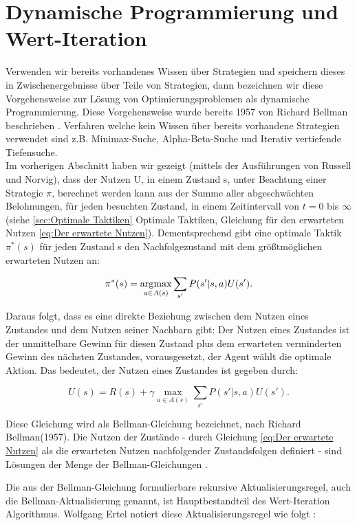 \section{Dynamische Programmierung und Wert-Iteration}
Verwenden wir bereits vorhandenes Wissen über Strategien und speichern dieses in Zwischenergebnisse über Teile von Strategien, dann bezeichnen wir diese Vorgehensweise zur Lösung von Optimierungsproblemen als dynamische Programmierung. Diese Vorgehensweise wurde bereits 1957 von Richard Bellman beschrieben \cite[293]{Ertel}. Verfahren welche kein Wissen über bereits vorhandene Strategien verwendet sind z.B. Minimax-Suche, Alpha-Beta-Suche und Iterativ vertiefende Tiefensuche.\\

Im vorherigen Abschnitt haben wir gezeigt (mittels der Ausführungen von Russell und Norvig), dass der Nutzen U, in einem Zustand s, unter Beachtung einer Strategie $\pi$, berechnet werden kann aus der Summe aller abgeschwächten Belohnungen, für jeden besuchten Zustand, in einem Zeitintervall von $t = 0$ bis $\infty$ (siehe \ref{sec:Optimale Taktiken} Optimale Taktiken, Gleichung für den erwarteten Nutzen \ref{eq:Der erwartete Nutzen}). Dementsprechend gibt eine optimale Taktik $\pi^*(s)$ für jeden Zustand s den Nachfolgezustand mit dem größtmöglichen erwarteten Nutzen an:

\begin{equation}
\pi^*(s) = \operatorname*{arg\!\max}_{a \in A(s)} \sum_{s'} P(s'|s, a) U(s').
\end{equation}

Daraus folgt, dass es eine direkte Beziehung zwischen dem Nutzen eines Zustandes und dem Nutzen seiner Nachbarn gibt: Der Nutzen eines Zustandes ist der unmittelbare Gewinn für diesen Zustand plus dem erwarteten verminderten Gewinn des nächsten Zustandes, vorausgesetzt, der Agent wählt die optimale Aktion. Das bedeutet, der Nutzen eines Zustandes ist gegeben durch:

\begin{equation}
U(s) = R(s) + \gamma \max_{a \in A(s)} \sum_{s'} P(s'|s, a) U(s').
\end{equation}

Diese Gleichung wird als Bellman-Gleichung bezeichnet, nach Richard Bellman(1957). Die Nutzen der Zustände - durch Gleichung \ref{eq:Der erwartete Nutzen} als die erwarteten Nutzen nachfolgender Zustandsfolgen definiert - sind Lösungen der Menge der Bellman-Gleichungen \cite[759]{Russell}.

Die aus der Bellman-Gleichung formulierbare rekursive Aktualisierungsregel, auch die Bellman-Aktualisierung genannt, ist Hauptbestandteil des Wert-Iteration Algorithmus. Wolfgang Ertel notiert diese Aktualisierungsregel wie folgt \cite[294]{Ertel}:

